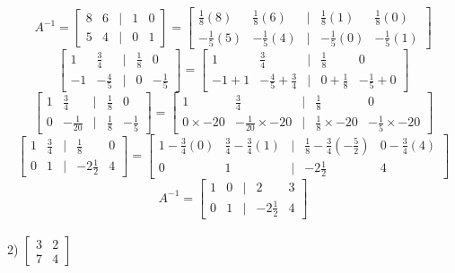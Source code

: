 \documentclass[a4paper]{article}
\begin{document}
\[A^{-1} = 
\begin{bmatrix}
8&6&|&1&0\\
5&4&|&0&1
\end{bmatrix} = 
\begin{bmatrix}
\frac{1}{8}(8)&\frac{1}{8}(6)&|&\frac{1}{8}(1)&\frac{1}{8}(0)\\
-\frac{1}{5}(5)&-\frac{1}{5}(4)&|&-\frac{1}{5}(0)&-\frac{1}{5}(1)
\end{bmatrix}\]
\[
\begin{bmatrix}
1&\frac{3}{4}&|&\frac{1}{8}&0\\
-1&-\frac{4}{5}&|&0&-\frac{1}{5}
\end{bmatrix} =
\begin{bmatrix}
1&\frac{3}{4}&|&\frac{1}{8}&0\\
-1+1&-\frac{4}{5}+\frac{3}{4}&|&0+\frac{1}{8}&-\frac{1}{5}+0
\end{bmatrix}
\]
\[
\begin{bmatrix}
1&\frac{3}{4}&|&\frac{1}{8}&0\\
0&-\frac{1}{20}&|&\frac{1}{8}&-\frac{1}{5}
\end{bmatrix} =
\begin{bmatrix}
1&\frac{3}{4}&|&\frac{1}{8}&0\\
0\times-20&-\frac{1}{20}\times-20&|&\frac{1}{8}\times-20&-\frac{1}{5}\times-20
\end{bmatrix}
\]
\[
\begin{bmatrix}
1&\frac{3}{4}&|&\frac{1}{8}&0\\
0&1&|&-2\frac{1}{2}&4
\end{bmatrix} =
\begin{bmatrix}
1-\frac{3}{4}(0)&\frac{3}{4}-\frac{3}{4}(1)&|&\frac{1}{8}-\frac{3}{4}(-\frac{5}{2})&0-\frac{3}{4}(4)\\
0&1&|&-2\frac{1}{2}&4
\end{bmatrix}
\]
\[A^{-1} =
\begin{bmatrix}
1&0&|&2&3\\
0&1&|&-2\frac{1}{2}&4
\end{bmatrix}
\]\\

2) $\begin{bmatrix}
3&2\\
7&4
\end{bmatrix}$
\end{document}
